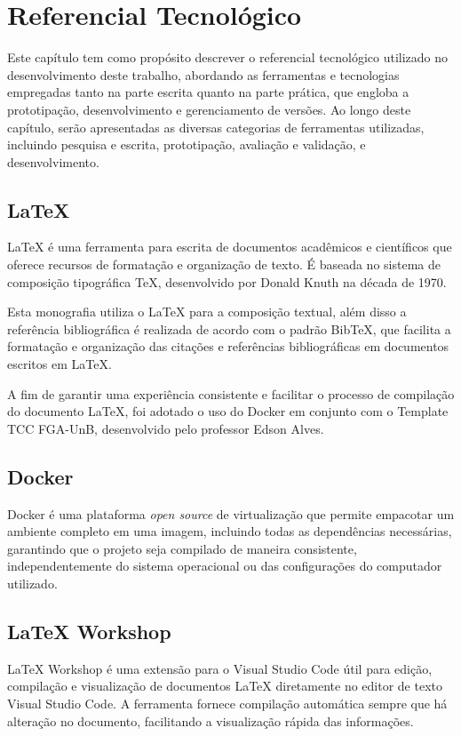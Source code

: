 \chapter[Referencial Tecnológico]{Referencial Tecnológico}

Este capítulo tem como propósito descrever o referencial tecnológico utilizado no 
desenvolvimento deste trabalho, abordando as ferramentas e tecnologias empregadas 
tanto na parte escrita quanto na parte prática, que engloba a prototipação, 
desenvolvimento e gerenciamento de versões. Ao longo deste capítulo, serão apresentadas 
as diversas categorias de ferramentas utilizadas, incluindo pesquisa e escrita, 
prototipação, avaliação e validação, e desenvolvimento.

\section{LaTeX}
\label{sec:Latex}
LaTeX \cite{latex} é uma ferramenta para escrita de documentos acadêmicos e científicos que oferece 
recursos de formatação e organização de texto. É baseada no sistema de composição tipográfica 
TeX, desenvolvido por Donald Knuth na década de 1970.

Esta monografia utiliza o LaTeX para a composição textual, além disso a referência bibliográfica 
é realizada de acordo com o padrão BibTeX, que facilita a formatação e organização das citações e 
referências bibliográficas em documentos escritos em LaTeX.

A fim de garantir uma experiência consistente e facilitar o processo de compilação do documento LaTeX, foi 
adotado o uso do Docker em conjunto com o Template TCC FGA-UnB, desenvolvido pelo professor 
Edson Alves. 

\section{Docker}
\label{sec:Docker}
Docker é uma plataforma \textit{open source} de virtualização que permite empacotar um ambiente completo em 
uma imagem, incluindo todas as dependências necessárias, garantindo que o projeto seja 
compilado de maneira consistente, independentemente do sistema operacional ou das configurações do computador 
utilizado.

\section{LaTeX Workshop}
\label{sec:LaTeX Workshop}
LaTeX Workshop é uma extensão para o Visual Studio Code útil para edição, compilação e visualização de 
documentos LaTeX diretamente no editor de texto Visual Studio Code. A ferramenta fornece compilação 
automática sempre que há alteração no documento, facilitando a visualização rápida das informações.

